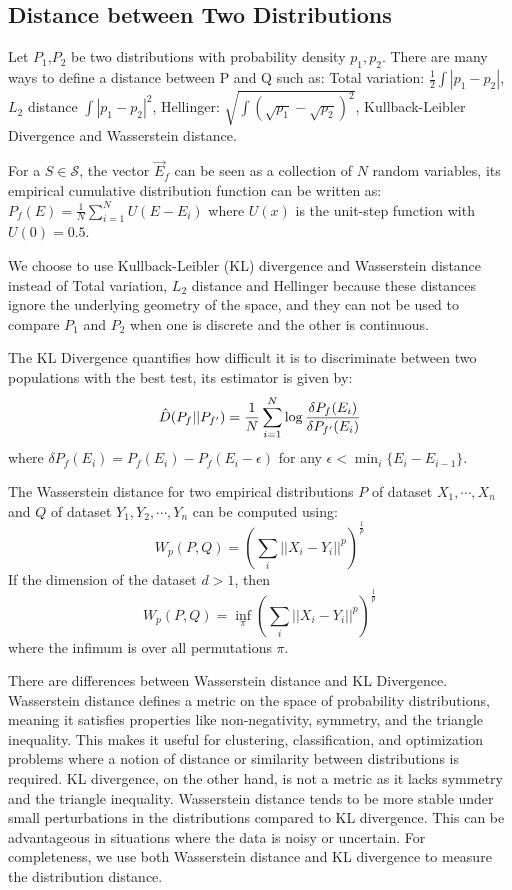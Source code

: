 \documentclass[letterpaper,12pt]{article}
\begin{document}
\subsection{Distance between Two Distributions}
Let $P_1$,$P_2$ be two distributions with probability density $p_1,p_2$. 
There are many ways to define a distance between P and Q such as:
Total variation: $\frac{1}{2}\int |p_1 - p_2|$, $L_2$ distance $\int |p_1 - p_2|^2$, Hellinger: $\sqrt{\int (\sqrt{p_1}-\sqrt{p_2})^2}$, Kullback-Leibler Divergence\cite{csiszar_divergence_1975} and Wasserstein distance\cite{villani_optimal_2009}.

For a $S \in \mathcal{S}$, the vector $\Vec{E}_f$ can be seen as a collection of $N$ random variables, its empirical cumulative distribution function can be written as:
$P_f(E) = \frac{1}{N} \sum\limits_{i=1}^N U(E-E_i)$ where $U(x)$ is the unit-step function with $U(0) = 0.5$. 

We choose to use Kullback-Leibler (KL) divergence and Wasserstein distance instead of Total variation, $L_2$ distance and Hellinger 
because these distances ignore the underlying geometry of the space, and they can not be used to compare $P_1$ and $P_2$ when one is discrete and the other is continuous.

The KL Divergence quantifies how difficult it is to discriminate between two populations with the best test\cite{csiszar_divergence_1975}, its estimator is given by\cite{noauthor_2008_2008}:
\begin{equation}
    \Hat{D}(P_f||P_{f'}) = \frac{1}{N} \sum\limits_{i=1}^N \log \frac{\delta P_f(E_i)}{\delta P_{f'}(E_i)}
\end{equation}
where $\delta P_f(E_i) = P_f(E_i) - P_f(E_i - \epsilon) $ for any $\epsilon < \min_i \{ E_i - E_{i-1} \}$.

The Wasserstein distance for two empirical distributions $P$ of dataset $X_1,\cdots,X_n$ and $Q$ of dataset $Y_1, Y_2,\cdots, Y_n$ can be computed using:
\begin{equation}
    W_p (P,Q) = (\sum_i || X_i - Y_i ||^p )^{\frac{1}{p}}
\end{equation}
If the dimension of the dataset $d>1$,  then
\begin{equation}
    W_p (P,Q) = \inf_{\pi} (\sum_i || X_i - Y_i ||^p )^{\frac{1}{p}}
\end{equation}
where the infimum is over all permutations $\pi$. 

There are differences between Wasserstein distance and KL Divergence.
Wasserstein distance defines a metric on the space of probability distributions, meaning it satisfies properties like non-negativity, symmetry, and the triangle inequality. This makes it useful for clustering, classification, and optimization problems where a notion of distance or similarity between distributions is required. KL divergence, on the other hand, is not a metric as it lacks symmetry and the triangle inequality.
Wasserstein distance tends to be more stable under small perturbations in the distributions compared to KL divergence. This can be advantageous in situations where the data is noisy or uncertain. For completeness, we use both Wasserstein distance and KL divergence to measure the distribution distance.
\end{document}
